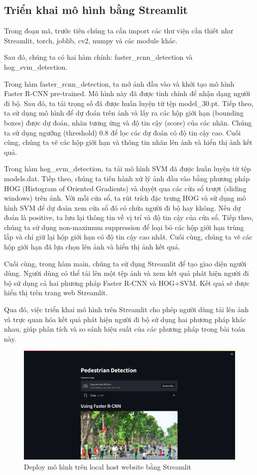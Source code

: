 \subsection{Triển khai mô hình bằng Streamlit}
Trong đoạn mã, trước tiên chúng ta cần import các thư viện cần thiết như Streamlit, torch, joblib, cv2, numpy và các module khác.

Sau đó, chúng ta có hai hàm chính: faster\_rcnn\_detection và hog\_svm\_detection.

Trong hàm faster\_rcnn\_detection, ta mở ảnh đầu vào và khởi tạo mô hình Faster R-CNN pre-trained. Mô hình này đã được tinh chỉnh để nhận dạng người đi bộ. Sau đó, ta tải trọng số đã được huấn luyện từ tệp model\_30.pt. Tiếp theo, ta sử dụng mô hình để dự đoán trên ảnh và lấy ra các hộp giới hạn (bounding boxes) được dự đoán, nhãn tương ứng và độ tin cậy (score) của các nhãn. Chúng ta sử dụng ngưỡng (threshold) 0.8 để lọc các dự đoán có độ tin cậy cao. Cuối cùng, chúng ta vẽ các hộp giới hạn và thông tin nhãn lên ảnh và hiển thị ảnh kết quả.

Trong hàm hog\_svm\_detection, ta tải mô hình SVM đã được huấn luyện từ tệp models.dat. Tiếp theo, chúng ta tiến hành xử lý ảnh đầu vào bằng phương pháp HOG (Histogram of Oriented Gradients) và duyệt qua các cửa sổ trượt (sliding windows) trên ảnh. Với mỗi cửa sổ, ta rút trích đặc trưng HOG và sử dụng mô hình SVM để dự đoán xem cửa sổ đó có chứa người đi bộ hay không. Nếu dự đoán là positive, ta lưu lại thông tin về vị trí và độ tin cậy của cửa sổ. Tiếp theo, chúng ta sử dụng non-maximum suppression để loại bỏ các hộp giới hạn trùng lắp và chỉ giữ lại hộp giới hạn có độ tin cậy cao nhất. Cuối cùng, chúng ta vẽ các hộp giới hạn đã lựa chọn lên ảnh và hiển thị ảnh kết quả.

Cuối cùng, trong hàm main, chúng ta sử dụng Streamlit để tạo giao diện người dùng. Người dùng có thể tải lên một tệp ảnh và xem kết quả phát hiện người đi bộ sử dụng cả hai phương pháp Faster R-CNN và HOG+SVM. Kết quả sẽ được hiển thị trên trang web Streamlit.

Qua đó, việc triển khai mô hình trên Streamlit cho phép người dùng tải lên ảnh và trực quan hóa kết quả phát hiện người đi bộ sử dụng hai phương pháp khác nhau, giúp phân tích và so sánh hiệu suất của các phương pháp trong bài toán này.

\begin{figure}[h!]
  \centering
  \includegraphics[scale=0.35]{graphics/streamlit.png}
  \caption{Deploy mô hình trên local host website bằng Streamlit}
\end{figure}